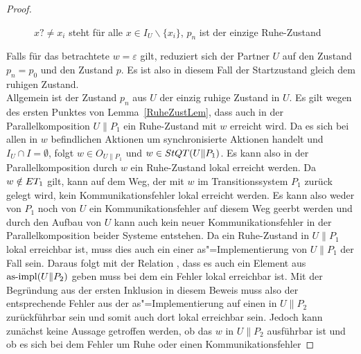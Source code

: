 \begin{proof}
\begin{figure} [h!tbp]
\begin{center}
    \caption{$x?\neq x_i$ steht für alle $x\in I_U\backslash\{x_i\}$, $p_n$
    ist der einzige Ruhe-Zustand}
  \label{UohneEmitI}
  \end{center}
  \end{figure}
  Falls für das betrachtete $w=\varepsilon$ gilt, reduziert sich der Partner
  $U$ auf den Zustand $p_n=p_0$ und den Zustand $p$. Es ist also in diesem Fall
  der Startzustand gleich dem ruhigen Zustand.\\
  Allgemein ist der Zustand $p_n$ aus $U$ der einzig ruhige Zustand in $U$. Es
  gilt wegen des ersten Punktes von Lemma~\ref{RuheZustLem}, dass auch in der
  Parallelkomposition $U\|P_1$ ein Ruhe-Zustand mit $w$ erreicht wird. Da es
  sich bei allen in $w$ befindlichen Aktionen um synchronisierte Aktionen
  handelt und $I_U\cap I=\emptyset$, folgt $w\in O_{U\|P_1}$ und $w\in StQT
  (U\|P_1)$. Es kann also in der Parallelkomposition durch $w$ ein Ruhe-Zustand
  lokal erreicht werden. Da $w\notin ET _1$ gilt, kann auf dem Weg, der mit $w$
  im Transitionssystem $P_1$ zurück gelegt wird, kein Kommunikationsfehler
  lokal erreicht werden. Es kann also weder von $P_1$ noch von $U$ ein
  Kommunikationsfehler auf diesem Weg geerbt werden und durch den Aufbau von
  $U$ kann auch kein neuer Kommunikationsfehler in der Parallelkomposition
  beider Systeme entstehen. Da ein Ruhe-Zustand in $U\|P_1$ lokal erreichbar
  ist, muss dies auch ein einer as"=Implementierung von $U\|P_1$ der Fall sein.
  Daraus folgt mit der Relation \QBRel{}, dass es auch ein Element aus $\mathrm{as}\text{-}\mathrm{impl}
  (U\|P_2)$ geben muss bei dem ein Fehler lokal erreichbar ist. Mit der
  Begründung aus der ersten Inklusion in diesem Beweis muss also der
  entsprechende Fehler aus der as"=Implementierung auf einen in $U\|P_2$
  zurückführbar sein und somit auch dort lokal erreichbar sein. Jedoch kann
  zunächst keine Aussage getroffen werden, ob das $w$ in $U\|P_2$ ausführbar
  ist und ob es sich bei dem Fehler um Ruhe oder einen Kommunikationsfehler

\end{proof}

